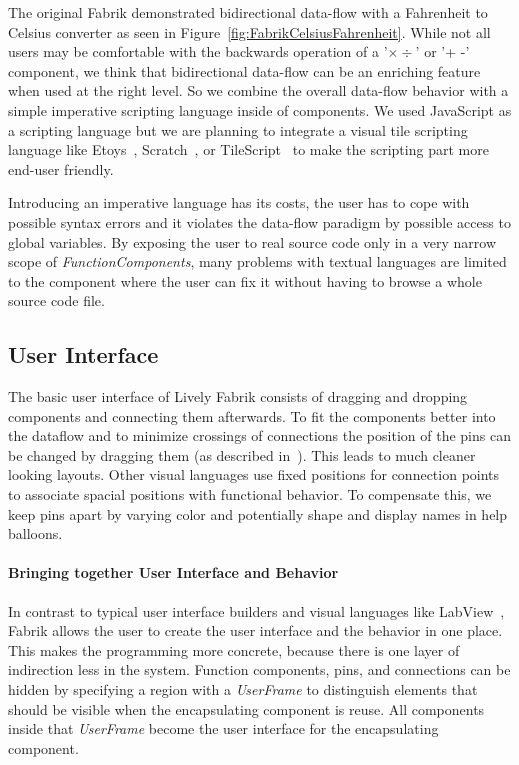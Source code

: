 \documentclass[pdftex, times, 10pt, twocolumn]{article}
\begin{document}
The original Fabrik demonstrated bidirectional data-flow with a Fahrenheit to Celsius converter as seen in Figure~\ref{fig:FabrikCelsiusFahrenheit}. While not all users may be comfortable with the backwards operation of a  '$\times \div$' or '+ -' component, we think that bidirectional data-flow can be an enriching feature when used at the right level. So we combine the overall data-flow behavior with a simple imperative scripting language inside of components.  We used JavaScript as a scripting language but we are planning to integrate a visual tile scripting language like Etoys~\cite{Kay2005SEA}, Scratch~\cite{Maloney2004SSP}, or TileScript~\cite{Warth2008TMS} to make the scripting part more end-user friendly.  

Introducing an imperative language has its costs, the user has to cope with possible syntax errors and it violates the data-flow paradigm by possible access to global variables.  By exposing the user to real source code only in a very narrow scope of {\em FunctionComponents}, many problems with textual languages are limited to  the component where the user can fix it without having to browse a whole source code file.  



\subsection{User Interface}
The basic user interface of Lively Fabrik consists of dragging and dropping components and connecting them afterwards. To fit the components better into the dataflow and to minimize crossings of connections the position of the pins can be changed by dragging them (as described in~\cite{Ludolph1988FPE}). This leads to much cleaner looking layouts. Other visual languages use fixed positions for connection points to associate spacial positions with functional behavior. To compensate this, we keep pins apart by varying  color and potentially shape and display names in help balloons.  



\paragraph{Bringing together User Interface and Behavior}
In contrast to typical user interface builders and visual languages like LabView~\cite{Bitter2006LAP}, Fabrik allows the user to create the user interface and the behavior in one place. This makes the programming more concrete, because there is one layer of indirection less in the system. Function components, pins, and connections can be hidden by specifying a region with a {\em UserFrame} to distinguish elements that should be visible when the encapsulating component is reuse. All components inside that {\em UserFrame} become the user interface for the encapsulating component.  
\end{document}
